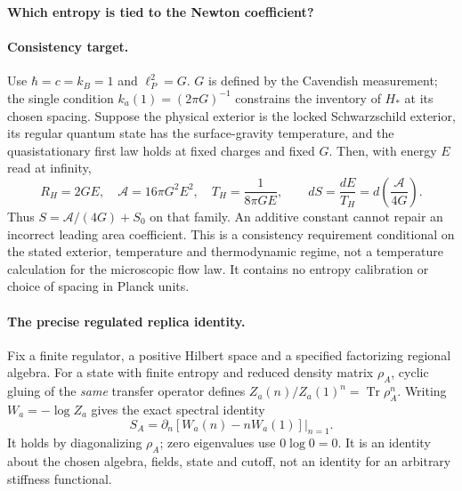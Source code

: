 \documentclass[10pt]{article}
\newcommand{\Tr}{\operatorname{Tr}}
\begin{document}
\begin{center}\textbf{Which entropy is tied to the Newton coefficient?}\end{center}

\paragraph{Consistency target.}
Use $\hbar=c=k_B=1$ and $\ell_P^2=G$.
$G$ is defined by the Cavendish measurement; the single condition
$k_a(1)=(2\pi G)^{-1}$ constrains the inventory of $H_*$ at its chosen
spacing. Suppose the physical exterior is the locked Schwarzschild
exterior, its regular quantum state has the surface-gravity temperature,
and the quasistationary first law holds at fixed charges and fixed $G$.
Then, with energy $E$ read at infinity,
\[
 R_H=2GE,\quad \mathcal A=16\pi G^2E^2,\quad
 T_H=\frac1{8\pi GE},\qquad
 dS=\frac{dE}{T_H}=d\!\left(\frac{\mathcal A}{4G}\right).
\]
Thus $S=\mathcal A/(4G)+S_0$ on that family. An additive constant
cannot repair an incorrect leading area coefficient. This is a
consistency requirement conditional on the stated exterior,
temperature and thermodynamic regime, not a temperature calculation
for the microscopic flow law. It contains no entropy calibration or
choice of spacing in Planck units.

\paragraph{The precise regulated replica identity.}
Fix a finite regulator, a positive Hilbert space and a specified
factorizing regional algebra. For a state with finite entropy and reduced density
matrix $\rho_A$, cyclic gluing of the \emph{same} transfer operator
defines $Z_a(n)/Z_a(1)^n=\Tr\rho_A^n$. Writing $W_a=-\log Z_a$ gives
the exact spectral identity
\begin{equation}
 S_A=\left.\partial_n[W_a(n)-nW_a(1)]\right|_{n=1}.
 \label{eq:ec-replica}
\end{equation}
It holds by diagonalizing $\rho_A$; zero eigenvalues use $0\log0=0$.
It is an identity about the chosen algebra, fields, state and cutoff,
not an identity for an arbitrary stiffness functional.
\end{document}
